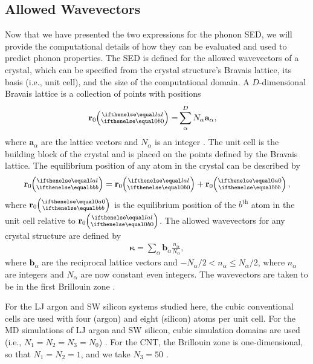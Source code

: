\subsection{\label{Subsection_Comp_Details_1}Allowed Wavevectors}
Now that we have presented the two expressions for the phonon SED, we will 
provide the computational details of how they can be evaluated and used 
to predict 
phonon properties. The SED is defined for the allowed wavevectors of a 
crystal, which can 
be specified from the crystal structure's Bravais lattice, its basis (i.e., 
unit cell), and 
the size of the computational domain. A $D$-dimensional Bravais lattice 
is a collection of 
points with
positions
\begin{equation}\label{crys_pos}
\begin{split}
\mathbf{r}_0\ab{l}{0} =& \sum^D_{\alpha} N_{\alpha}\mathbf{a}_{\alpha},
\end{split}
\end{equation}
where $\mathbf{a}_{\alpha}$ are the lattice vectors and $N_{\alpha}$ is 
an integer 
\cite{dove_introduction_1993}. The unit cell is the building block of 
the crystal and is placed on the 
points defined by the Bravais lattice. The equilibrium position of any 
atom in the crystal 
can be described by
\begin{equation}\label{crys_pos2}
\begin{split}
\mathbf{r}_0\ab{l}{b} = \mathbf{r}_0\ab{l}{0} + \mathbf{r}_0\ab{0}{b},
\end{split}
\end{equation}
where $\mathbf{r}_0\ab{0}{b}$ is the equilibrium position of the 
$b^{\textrm{th}}$ atom in 
the unit cell relative to $\mathbf{r}_0\ab{l}{0}$. The allowed wavevectors 
for any crystal 
structure are defined by
\begin{equation}\label{crys_pos3}
\begin{split}
\pmb{\kappa} = \sum_{\alpha} \mathbf{b}_{\alpha} 
\frac{n_{\alpha}}{N_{\alpha}},
\end{split}
\end{equation}
where $\mathbf{b}_{\alpha}$ are the reciprocal lattice vectors and 
$-N_{\alpha}/2 < 
n_{\alpha} \leq N_{\alpha}/2$, where $n_{\alpha}$ are integers and 
$N_{\alpha}$ are now 
constant even integers. The wavevectors are taken to be in the first 
Brillouin zone 
\cite{ashcroft_solid_1976}.

For the LJ argon and SW silicon systems studied here, the cubic 
conventional cells are 
used with four (argon) and eight (silicon) atoms per unit cell. For the 
MD simulations of
 LJ argon and SW silicon, cubic simulation domains are used (i.e., 
 $N_1 = N_2 = N_3 = N_0$) 
\cite{mcgaughey_quantitative_2004,turney_predicting_2009,
sellan_size_2010}. For the CNT, the Brillouin 
zone is one-dimensional, 
so that $N_1 = N_2 = 1$, and we take $N_3=50$ 
\cite{thomas_predicting_2010}.
